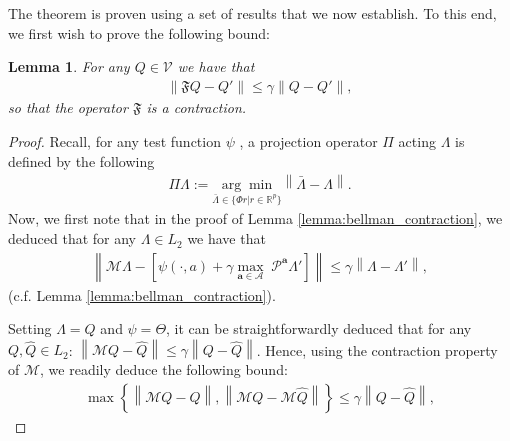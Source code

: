 \documentclass{article}
\newtheorem{lemma}{Lemma}
\begin{document}
The theorem is proven using a set of results that we now establish. To this end, we first wish to prove the following bound:    
\begin{lemma}
For any $Q\in\mathcal{V}$ we have that
\begin{align}
    \left\|\mathfrak{F}Q-Q'\right\|\leq \gamma\left\|Q-Q'\right\|,
\end{align}
so that the operator $\mathfrak{F}$ is a contraction.
\end{lemma}
\begin{proof}
Recall, for any test function $\psi$ , a projection operator $\Pi$ acting $\Lambda$ is defined by the following 
\begin{align*}
\Pi \Lambda:=\underset{\bar{\Lambda}\in\{\Phi r|r\in\mathbb{R}^p\}}{\arg\min}\left\|\bar{\Lambda}-\Lambda\right\|. 
\end{align*}
Now, we first note that in the proof of Lemma \ref{lemma:bellman_contraction}, we deduced that for any $\Lambda\in L_2$ we have that
\begin{align*}
    \left\|\mathcal{M}\Lambda-\left[ \psi(\cdot,a)+\gamma\underset{\boldsymbol{a}\in\boldsymbol{\mathcal{A}}}{\max}\;\mathcal{P}^{\boldsymbol{a}}\Lambda'\right]\right\|\leq \gamma\left\|\Lambda-\Lambda'\right\|,
\end{align*}
(c.f. Lemma \ref{lemma:bellman_contraction}). 

Setting $\Lambda=Q$ and $\psi=\Theta$, it can be straightforwardly deduced that for any $Q,\hat{Q}\in L_2$:
    $\left\|\mathcal{M}Q-\hat{Q}\right\|\leq \gamma\left\|Q-\hat{Q}\right\|$. Hence, using the contraction property of $\mathcal{M}$, we readily deduce the following bound:
\begin{align}\max\left\{\left\|\mathcal{M}Q-\hat{Q}\right\|,\left\|\mathcal{M}Q-\mathcal{M}\hat{Q}\right\|\right\}\leq \gamma\left\|Q-\hat{Q}\right\|,
\label{m_bound_q_twice}
\end{align}
    

\end{proof}
\end{document}
